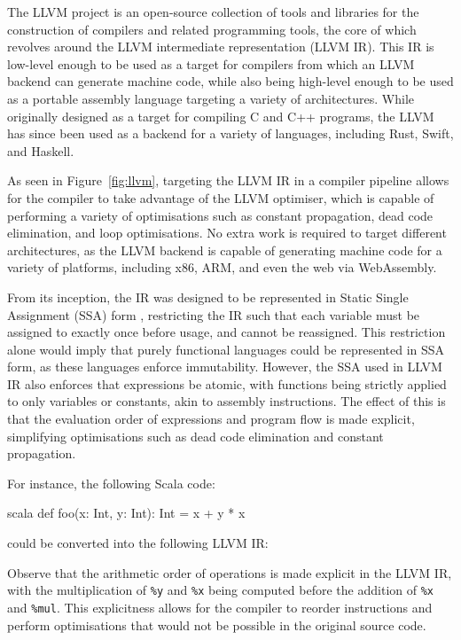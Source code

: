The LLVM project is an open-source collection of tools and libraries for the construction of
compilers and related programming tools, the core of which revolves around the LLVM intermediate
representation (LLVM IR). This IR is low-level enough to be used as a target for compilers from
which an LLVM backend can generate machine code, while also being high-level enough to be used as a
portable assembly language targeting a variety of architectures. While originally designed as a
target for compiling C and C++ programs, the LLVM has since been used as a backend for a variety of
languages, including Rust, Swift, and Haskell.

As seen in Figure~\ref{fig:llvm}, targeting the LLVM IR in a compiler pipeline allows for the
compiler to take advantage of the LLVM optimiser, which is capable of performing a variety of
optimisations such as constant propagation, dead code elimination, and loop optimisations. No extra
work is required to target different architectures, as the LLVM backend is capable of generating
machine code for a variety of platforms, including x86, ARM, and even the web via WebAssembly.

From its inception, the IR was designed to be represented in Static Single Assignment (SSA) form
\autocite{lattner2004llvm}, restricting the IR such that each variable must be assigned to exactly
once before usage, and cannot be reassigned. This restriction alone would imply that purely
functional languages could be represented in SSA form, as these languages enforce immutability.
However, the SSA used in LLVM IR also enforces that expressions be atomic, with functions being
strictly applied to only variables or constants, akin to assembly instructions. The effect of this
is that the evaluation order of expressions and program flow is made explicit, simplifying
optimisations such as dead code elimination and constant propagation.

For instance, the following Scala code:

\begin{code}{scala}
    def foo(x: Int, y: Int): Int = x + y * x
\end{code}

could be converted into the following LLVM IR:


Observe that the arithmetic order of operations is made explicit in the LLVM IR, with the
multiplication of \texttt{\%y} and \texttt{\%x} being computed before the addition of \texttt{\%x}
and \texttt{\%mul}. This explicitness allows for the compiler to reorder instructions and perform
optimisations that would not be possible in the original source code.

